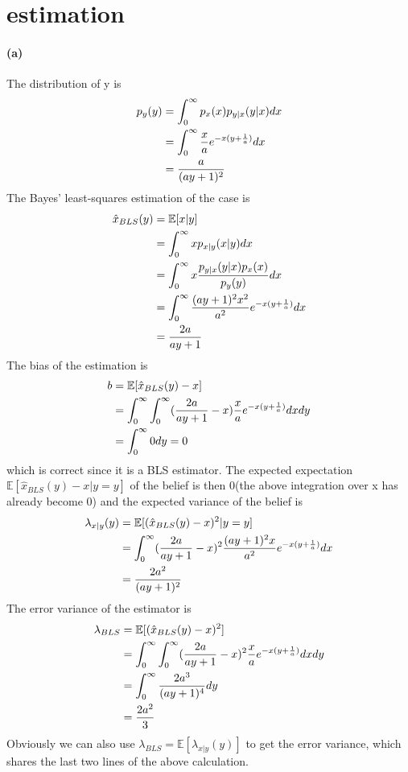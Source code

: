 \documentclass{article}
\begin{document}
\section{estimation}
\paragraph{(a)}
The distribution of y is 
\begin{align}
	p_y(y)&=\int^{\infty}_{0}p_x(x)p_{y|x}(y|x)dx\notag\\
	&=\int^{\infty}_{0}\frac{x}{a}e^{-x(y+\frac{1}{a})}dx\notag\\
	&=\frac{a}{(ay+1)^2}\notag
\end{align}
The Bayes' least-squares estimation of the case is
\begin{align}
	\hat{x}_{BLS}(y)&=\mathbb{E}[x|y]\notag\\
	&=\int^{\infty}_{0}xp_{x|y}(x|y)dx\notag\\
	&=\int^{\infty}_{0}x\frac{p_{y|x}(y|x)p_x(x)}{p_y(y)}dx\notag\\
	&=\int^{\infty}_{0}\frac{(ay+1)^2x^2}{a^2}e^{-x(y+\frac{1}{a})}dx\notag\\
	&=\frac{2a}{ay+1}\notag
\end{align}
The bias of the estimation is
\begin{align}
	b&=\mathbb{E}[\hat{x}_{BLS}(y)-x]\notag\\
	&=\int^{\infty}_{0}\int^{\infty}_{0}(\frac{2a}{ay+1}-x)\frac{x}{a}e^{-x(y+\frac{1}{a})}dxdy\notag\\
	&=\int^{\infty}_{0}0dy=0\notag
\end{align}
which is correct since it is a BLS estimator. The expected expectation $\mathbb{E}[\hat{x}_{BLS}(y)-x|y=y]$ of the belief is then 0(the above integration over x has already become 0) and the expected variance of the belief is
\begin{align}
	\lambda_{x|y}(y)&=\mathbb{E}[(\hat{x}_{BLS}(y)-x)^2|y=y]\notag\\
	&=\int^{\infty}_{0}(\frac{2a}{ay+1}-x)^2\frac{(ay+1)^2x}{a^2}e^{-x(y+\frac{1}{a})}dx\notag\\
	&=\frac{2a^2}{(ay+1)^2}\notag
\end{align}
The error variance of the estimator is
\begin{align}
	\lambda_{BLS}&=\mathbb{E}[(\hat{x}_{BLS}(y)-x)^2]\notag\\
	&=\int^{\infty}_{0}\int^{\infty}_{0}(\frac{2a}{ay+1}-x)^2\frac{x}{a}e^{-x(y+\frac{1}{a})}dxdy\notag\\
	&=\int^{\infty}_{0}\frac{2a^3}{(ay+1)^4}dy\notag\\
	&=\frac{2a^2}{3}\notag
\end{align}
Obviously we can also use $\lambda_{BLS}=\mathbb{E}[\lambda_{x|y}(y)]$ to get the error variance, which shares the last two lines of the above calculation.
\end{document}
